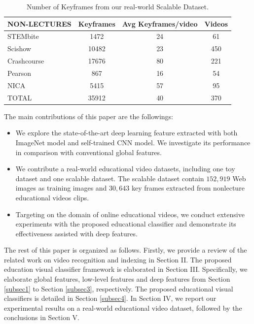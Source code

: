 \documentclass[11pt,twocolumn,twoside]{IEEEtran}
\begin{document}
\begin{table}[h]\scriptsize
  \centering
  \caption{Number of Keyframes from our real-world Scalable Dataset. }
    \begin{tabular}{|l|c|c|c|}

    \hline
    NON-LECTURES & Keyframes & Avg Keyframes/video & Videos \\
    \hline
    \hline
    STEMbite & 1472  & 24    & 61 \\
    Scishow  & 10482 & 23    & 450 \\
    Crashcourse & 17676 & 80    & 221 \\
    Pearson & 867   & 16    & 54 \\
    NICA  & 5415  & 57    & 95 \\
    \hline
    \hline
    TOTAL & 35912 & 40    & 370 \\
    \hline
    \end{tabular}%
  \label{tab:frames}%
\end{table}%

The main contributions of this paper are the followings:
\begin{itemize}
    \item We explore the state-of-the-art deep learning feature extracted with both ImageNet model and self-trained CNN model. We investigate its performance in comparison with conventional global features.
    \item We contribute a real-world educational video datasets, including one toy dataset and one scalable dataset. The scalable dataset contain $152,919$ Web images as training images and $30,643$ key frames extracted from nonlecture educational videos clips.
    \item Targeting on the domain of online educational videos, we conduct extensive experiments with the proposed educational classifier and demonstrate its effectiveness assisted with deep features.
\end{itemize}

The rest of this paper is organized as follows. Firstly, we provide a review of the related work on video recognition and indexing in Section II. The proposed education visual classifier framework is elaborated in Section III.
Specifically, we elaborate global features, low-level features and deep features from Section \ref{subsec1} to Section \ref{subsec3}, respectively. The proposed educational visual classifiers is detailed in Section \ref{subsec4}.
In Section IV, we report our experimental results on a real-world educational video dataset, followed by the conclusions in Section V.
\end{document}
